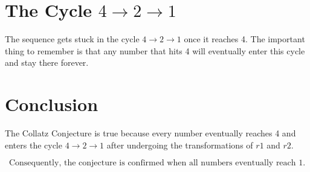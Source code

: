 \documentclass[12pt]{article}
\begin{document}
\section*{The Cycle \( 4 \to 2 \to 1 \)}
The sequence gets stuck in the cycle \( 4 \to 2 \to 1 \) once it reaches 4. The important thing to remember is that any number that hits 4 will eventually enter this cycle and stay there forever.

\section*{Conclusion}
The Collatz Conjecture is true because every number eventually reaches 4 and enters the cycle \( 4 \to 2 \to 1 \) after undergoing the transformations of \( r1 \) and \( r2 \).

\[
\boxed{\text{Consequently, the conjecture is confirmed when all numbers eventually reach 1.}}
\]
\end{document}
